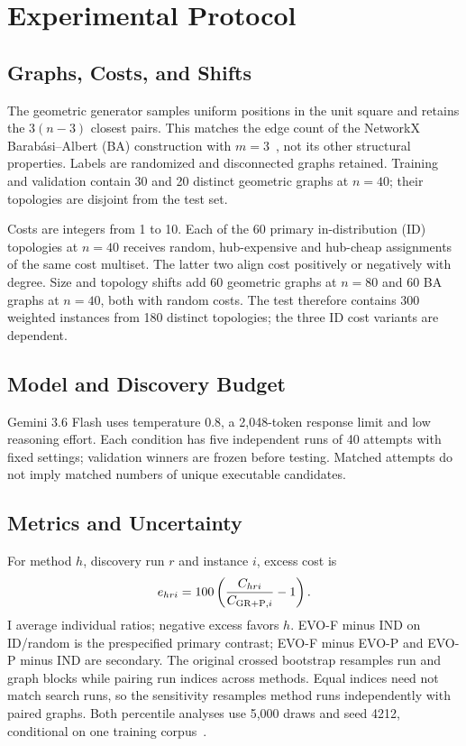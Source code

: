 \section{Experimental Protocol}
\subsection{Graphs, Costs, and Shifts}
The geometric generator samples uniform positions in the unit square and
retains the $3(n-3)$ closest pairs. This matches the edge count of the
NetworkX Barab\'asi--Albert (BA) construction with $m=3$~\cite{networkx_ba},
not its other structural properties. Labels are randomized and disconnected
graphs retained. Training and validation contain 30 and 20 distinct
geometric graphs at $n=40$; their topologies are disjoint from the test set.

Costs are integers from 1 to 10. Each of the 60 primary in-distribution
(ID) topologies at $n=40$ receives random, hub-expensive and hub-cheap
assignments of the same cost multiset. The latter two align cost positively
or negatively with degree. Size and topology shifts add 60 geometric
graphs at $n=80$ and 60 BA graphs at $n=40$, both with random costs.
The test therefore contains 300 weighted instances from 180 distinct
topologies; the three ID cost variants are dependent.

\subsection{Model and Discovery Budget}
Gemini 3.6 Flash uses temperature 0.8, a 2,048-token response limit and
low reasoning effort. Each condition has five independent runs of
40 attempts with fixed settings; validation winners are frozen before testing.
Matched attempts do not imply matched numbers of unique executable candidates.

\subsection{Metrics and Uncertainty}
For method $h$, discovery run $r$ and instance $i$, excess cost is
\begin{equation}
e_{hri}=100\left(\frac{C_{hri}}{C_{\mathrm{GR{+}P},i}}-1\right).
\label{eq:excess}
\end{equation}
I average individual ratios; negative excess favors $h$. EVO-F minus IND
on ID/random is the prespecified primary contrast; EVO-F minus EVO-P and
EVO-P minus IND are secondary. The original crossed bootstrap resamples
run and graph blocks while pairing run indices across methods. Equal
indices need not match search runs, so the sensitivity resamples method
runs independently with paired graphs. Both percentile analyses use
5,000 draws and seed 4212, conditional on one training corpus~\cite{efron}.

